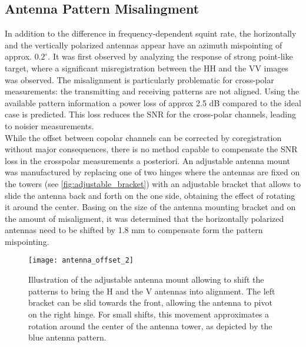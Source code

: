 \subsection{Antenna Pattern Misalingment}\label{sec:methods:misalingment}
In addition to the difference in frequency-dependent squint rate, the horizontally and the vertically polarized antennas appear have an azimuth mispointing of approx. $0.2^\circ$. It was first observed by analyzing the response of strong point-like target, where a significant misregistration between the HH and the VV images was observed. The misalignment is particularly problematic for cross-polar measurements: the transmitting and receiving patterns are not aligned. Using the available pattern information a power loss of approx 2.5 dB  compared to the ideal case is predicted. This loss reduces the SNR for the cross-polar channels, leading to noisier measurements.\\ While the offset between copolar channels can be corrected by coregistration without major consequences, there is no method capable to compensate the SNR loss in the crosspolar measurements a posteriori. An adjustable antenna mount was manufactured by replacing one of two hinges where the antennas are fixed on the towers (see \autoref{fig:adjustable_bracket}) with an adjustable bracket that allows to slide the antenna back and forth on the one side, obtaining the effect of rotating it around the center. Basing on the size of the antenna mounting bracket and on the amount of misaligment, it was determined that the horizontally polarized antennas need to be shifted by 1.8 mm to compensate form the pattern mispointing.
\begin{figure}[ht]
	\centering
	\texttt{[image: antenna\_offset\_2]}
	\caption{Illustration of the adjustable antenna mount allowing to shift the patterns to bring the H and the V antennas into alignment. The left bracket can be slid towards the front, allowing the antenna to pivot on the right hinge. For small shifts, this movement approximates a rotation around the center of the antenna tower, as depicted by the blue antenna pattern.}
	\label{fig:adjustable_bracket}
\end{figure}
